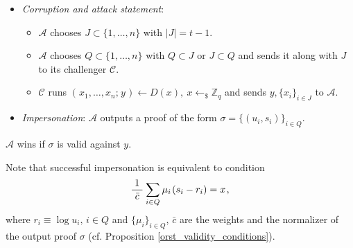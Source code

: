 \documentclass[psamsfonts, reqno]{amsart}
\theoremstyle{definition}
\theoremstyle{remark}
\numberwithin{equation}{section}
\begin{document}
\begin{itemize}[label=$\bullet$,leftmargin=20pt,rightmargin=0pt]
	\vspace{2pt}
	\item
		\textit{Corruption and attack statement}:
			\begin{itemize}[
				label=$\circ$,leftmargin=17pt,rightmargin=21pt
			]
			\vspace{0pt}
			\item $\mathcal{A}$ chooses $J \subset \{1, \dots, n\}$
				with $|J| = t-1$.
				\vspace{3pt}
			\item $\mathcal{A}$ chooses $Q \subset \{1, \dots, n\}$
				with $Q \subset J$  or $J \subset Q$ and
				sends it along with $J$ to its challenger
				$\mathcal{C}$.
				\vspace{3pt}
			\item $\mathcal{C}$ runs
				$(\hspace{1pt}x_1, \dots, x_n;\hspace{1pt} y\hspace{1pt})
				\leftarrow D(x), \ x \leftarrow_\$ \mathbb{Z}_q$
				and sends $y, \{x_i\}_{i \in J}$
				to $\mathcal{A}$.
			\vspace{0pt}
			\end{itemize}
	\item \textit{Impersonation}:
		$\mathcal{A}$ outputs a proof of the form
		$\sigma = \{(u_i, s_i)\}_{i \in Q}$.
\vspace{2pt}
\end{itemize}
\hspace*{5pt}%
\begin{minipage}{\dimexpr\textwidth-\parindent\relax}%
\hspace{0pt}
$\mathcal{A}$ wins if $\sigma$ is valid against $y$.
\vspace{6pt}
\end{minipage}%

\noindent
Note that successful impersonation is equivalent
to condition
\vspace{5pt}
\begin{equation}\label{threat_model_verify_1}
\frac{1}{\ \bar{c}\ }
\hspace{0.5pt}
\sum_{i \in Q}
	\hspace{0.5pt}
	\mu_i
	\hspace{1.0pt}
	(s_i - r_i)
=
x\hspace{1pt},
\vspace{5pt}
\end{equation}
where $r_i \equiv \log u_i,\hspace{2pt} i \in Q$ and
$\{\mu_i\}_{i \in Q}$, $\bar{c}$
are the weights and the normalizer of the
output proof $\sigma$
(cf. Proposition \ref{orst_validity_conditions}).
\end{document}
